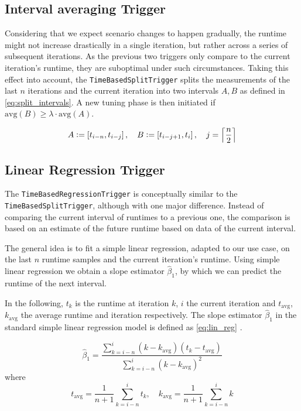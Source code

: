 \subsection{Interval averaging Trigger}
Considering that we expect scenario changes to happen gradually, the runtime might not increase drastically in a single iteration, but rather across a series of subsequent iterations. As the previous two triggers only compare to the current iteration's runtime, they are suboptimal under such circumstances. Taking this effect into account, the \texttt{TimeBasedSplitTrigger} splits the measurements of the last $n$ iterations and the current iteration into two intervals $A, B$ as defined in \eqref{eq:split_intervals}. A new tuning phase is then initiated if $\text{avg}(B)\ge \lambda\cdot \text{avg}(A)$.

\begin{equation}
	A \vcentcolon= \left[t_{i-n}, t_{i-j}\right],\quad B\vcentcolon= \left[t_{i-j+1},t_i\right],\quad j=\left\lceil\frac{n}{2}\right\rceil\label{eq:split_intervals}
\end{equation}



\subsection{Linear Regression Trigger}
The \texttt{TimeBasedRegressionTrigger} is conceptually similar to the \texttt{TimeBasedSplitTrigger}, although with one major difference. Instead of comparing the current interval of runtimes to a previous one, the comparison is based on an estimate of the future runtime based on data of the current interval.

The general idea is to fit a simple linear regression, adapted to our use case, on the last $n$ runtime samples and the current iteration's runtime. Using simple linear regression we obtain a slope estimator $\hat{\beta}_1$, by which we can predict the runtime of the next interval.

In the following, $t_k$ is the runtime at iteration $k$, $i$ the current iteration and $t_{\text{avg}}$, $k_{\text{avg}}$ the average runtime and iteration respectively. The slope estimator $\hat{\beta}_1$ in the standard simple linear regression model is defined as \eqref{eq:lin_reg} \cite{Abraham2006}.


\begin{equation}
	\hat{\beta}_1=\frac{\sum_{k=i-n}^{i}(k-k_{\text{avg}})(t_k-t_{\text{avg}})}{\sum_{k=i-n}^{i}(k-k_{\text{avg}})^2}\label{eq:lin_reg}
\end{equation}
where
\begin{equation}
	t_{\text{avg}}=\frac{1}{n+1}\sum_{k=i-n}^it_k, \quad k_{\text{avg}} = \frac{1}{n+1}\sum_{k=i-n}^ik\label{eq:lin_rev_avgs}
\end{equation}

